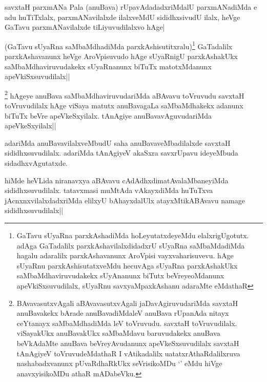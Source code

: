 \begin{artha}%
savxtaH parxmANa Pala (anuBava) rUpavAdadadxriMdalU parxmANadiMda e adu huTiTxlalx, parxmANavilalxde ilalxveMdU sididhxsivudU ilalx, heVge GaTavu parxmANavilalxde tiLiyuvudilalxvo hAge|
\end{artha}


\begin{artha}
(GaTavu sUyaRna saMbaMdhadiMda parxkAshisutitxralu)\footnote[1]{GaTavu sUyaRna parxkAshadiMda hoLeyutatxdeyeMdu elalxrigUgotutx. adAga GaTadalilx parxkAshavilalxdidadxrU sUyaRna saMbaMdadiMda hagalu adaralilx parxkAshavanunx AroVpisi vayxvaharisuvevu. hAge sUyaRnu parxkAshisutatxveMdu hecuvAga sUyaRna parxkAshakUkx saMbaMdhaviruvudakekx sUyAnanunx biTutx beVreyeoMdanunx apeVkiSxsuvudilalx, sUyaRnu savxyaMpaxkAshanu adaraMte eMdathaR} GaTadalilx parxkAshavanunx heVge AroVpisuvudo hAge sUyaRnigU parxkAshakUkx saMbaMdhaviruvudakekx sUyaRnanunx biTuTx matotxMdanunx apeVkiSxsuvudilalx||
\end{artha}

\begin{artha}
\footnote[2]{BAvavasutxvAgali aBAvavasutxvAgali jaDavAgiruvudariMda savxtaH anuBavakekx bArade anuBavadiMdaleV anuBava rUpanAda nitayx ceYtanayx saMbaMdhadiMda leV toVruvudu. savxtaH toVruvudilalx. viSayakUkx anuBavakUkx saMbaMdavu baruvudakekx anuBava beVkAdaMte anuBava beVreyAvudanunx apeVkeSxsuvudilalx savxtaH tAnAgiyeV toVruvudeMdathaR I vAtikadalilx uatatxrAthaRdalilxruva nashabadxvanunx pUvaRdhaRkUkx seVrisikoMDu `\stext ' eMdu hiVge anavxyisikoMDu athaR mADabeVku.} hAgeye anuBava saMbaMdhaviruvudariMda aBAvavu toVruvudu savxtaH toVruvudilalx hAge viSaya matutx anuBavagaLa saMbaMdhakekx adanunx biTuTx beVre apeVkeSxyilalx. tAnAgiye anuBavavAguvudariMda apeVkeSxyilalx||
\end{artha}

\begin{artha}
adariMda anuBavavilalxveMbudU saha anuBavaveMbadilalxde savxtaH sididhxsuvudilalx. adariMda tAnAgiyeV akaSxra savxrUpavu ideyeMbuda sidadhxvAgutatxde.
\end{artha}

\begin{artha}%
hiMde heVLida niranavxya aBAvavu cAdAdhxdimatAvalaMbaneyiMda sididhxsuvudilalx. tatavxmasi muMtAda vAkayxdiMda huTuTxva jAcnxnxvilalxdadxriMda elilxyU bAhayxdalUlx atayxMtikABAvavu namage sididhxsuvudilalx||
\end{artha}

